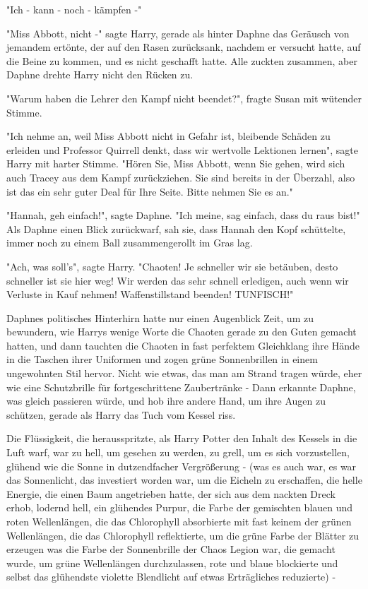 {"Ich - kann - noch - kämpfen -"

"Miss Abbott, nicht -" sagte Harry, gerade als hinter Daphne das Geräusch von jemandem ertönte, der auf den Rasen zurücksank, nachdem er versucht hatte, auf die Beine zu kommen, und es nicht geschafft hatte. Alle zuckten zusammen, aber Daphne drehte Harry nicht den Rücken zu.

"Warum haben die Lehrer den Kampf nicht beendet?", fragte Susan mit wütender Stimme.

"Ich nehme an, weil Miss Abbott nicht in Gefahr ist, bleibende Schäden zu erleiden und Professor Quirrell denkt, dass wir wertvolle Lektionen lernen", sagte Harry mit harter Stimme. "Hören Sie, Miss Abbott, wenn Sie gehen, wird sich auch Tracey aus dem Kampf zurückziehen. Sie sind bereits in der Überzahl, also ist das ein sehr guter Deal für Ihre Seite. Bitte nehmen Sie es an."

"Hannah, geh einfach!", sagte Daphne. "Ich meine, sag einfach, dass du raus bist!" Als Daphne einen Blick zurückwarf, sah sie, dass Hannah den Kopf schüttelte, immer noch zu einem Ball zusammengerollt im Gras lag.

"Ach, was soll's", sagte Harry. "Chaoten! Je schneller wir sie betäuben, desto schneller ist sie hier weg! Wir werden das sehr schnell erledigen, auch wenn wir Verluste in Kauf nehmen! Waffenstillstand beenden! TUNFISCH!"

Daphnes politisches Hinterhirn hatte nur einen Augenblick Zeit, um zu bewundern, wie Harrys wenige Worte die Chaoten gerade zu den Guten gemacht hatten, und dann tauchten die Chaoten in fast perfektem Gleichklang ihre Hände in die Taschen ihrer Uniformen und zogen grüne Sonnenbrillen in einem ungewohnten Stil hervor. Nicht wie etwas, das man am Strand tragen würde, eher wie eine Schutzbrille für fortgeschrittene Zaubertränke - Dann erkannte Daphne, was gleich passieren würde, und hob ihre andere Hand, um ihre Augen zu schützen, gerade als Harry das Tuch vom Kessel riss.

Die Flüssigkeit, die herausspritzte, als Harry Potter den Inhalt des Kessels in die Luft warf, war zu hell, um gesehen zu werden, zu grell, um es sich vorzustellen, glühend wie die Sonne in dutzendfacher Vergrößerung - (was es auch war, es war das Sonnenlicht, das investiert worden war, um die Eicheln zu erschaffen, die helle Energie, die einen Baum angetrieben hatte, der sich aus dem nackten Dreck erhob, lodernd hell, ein glühendes Purpur, die Farbe der gemischten blauen und roten Wellenlängen, die das Chlorophyll absorbierte mit fast keinem der grünen Wellenlängen, die das Chlorophyll reflektierte, um die grüne Farbe der Blätter zu erzeugen was die Farbe der Sonnenbrille der Chaos Legion war, die gemacht wurde, um grüne Wellenlängen durchzulassen, rote und blaue blockierte und selbst das glühendste violette Blendlicht auf etwas Erträgliches reduzierte) -

}
